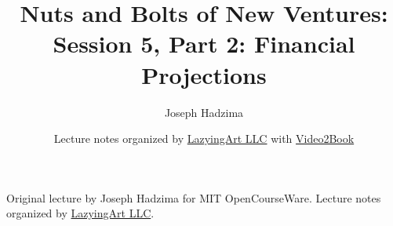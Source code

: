 \documentclass[11pt,oneside]{book}
\begin{document}
\frontmatter
\title{Nuts and Bolts of New Ventures: Session 5, Part 2: Financial Projections}
\author{Joseph Hadzima}
\date{Lecture notes organized by \href{https://lazying.art}{LazyingArt LLC} with \href{https://github.com/lachlanchen/Video2Book}{Video2Book}}
\maketitle
\begin{center}
\small Original lecture by Joseph Hadzima for MIT OpenCourseWare. Lecture notes organized by \href{https://lazying.art}{LazyingArt LLC}.
\end{center}
\clearpage
\mainmatter

\end{document}
